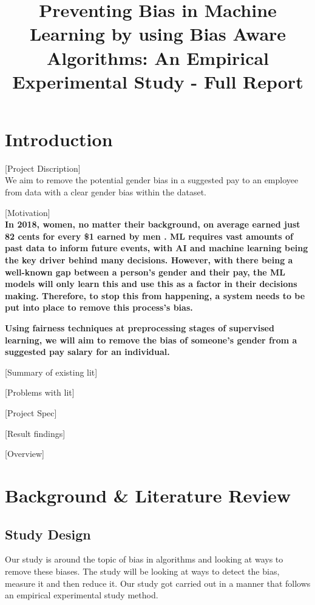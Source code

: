 \documentclass{sigchi}
\def\plaintitle{Preventing Bias in Machine Learning by using Bias Aware Algorithms: An Empirical Experimental Study - Full Report}
\begin{document}
\title{\plaintitle}

\author{%
}

\maketitle

\section{Introduction}

[Project Discription]\\
We aim to remove the potential gender bias in a suggested pay to an employee from data with a clear gender bias within the dataset. 

[Motivation]\\
\textbf{In 2018, women, no matter their background, on average earned just 82 cents for every \$1 earned by men \cite{1}. ML requires vast amounts of past data to inform future events, with AI and machine learning being the key driver behind many decisions. However, with there being a well-known gap between a person's gender and their pay, the ML models will only learn this and use this as a factor in their decisions making. Therefore, to stop this from happening, a system needs to be put into place to remove this process's bias.} 

\textbf{Using fairness techniques at preprocessing stages \cite{3} of supervised learning, we will aim to remove the bias of someone's gender from a suggested pay salary for an individual. }

[Summary of existing lit]

[Problems with lit]

[Project Spec]

[Result findings]

[Overview]

\section{Background \& Literature Review}


\subsection{Study Design}
	Our study is around the topic of bias in algorithms and looking at ways to remove these biases. The study will be looking at ways to detect the bias, measure it and then reduce it. Our study got carried out in a manner that follows an empirical experimental study method. 
\end{document}
